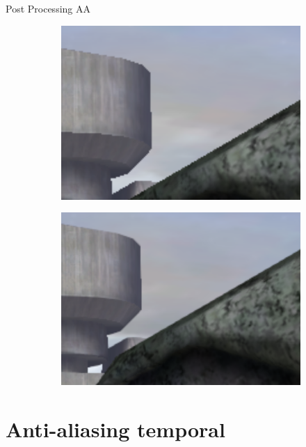 \documentclass[table]{beamer}
\begin{document}
\begin{frame}[fragile]{Post Processing AA}
    \begin{figure}[!htbp]
        \centering
        \begin{subfigure}[b]{0.45\textwidth}
            \includegraphics[width=\textwidth]{figures/smaaOFF.png}
        \end{subfigure}
        \centering
        \begin{subfigure}[b]{0.45\textwidth}
            \includegraphics[width=\textwidth]{figures/smaaON.png}
        \end{subfigure}
    \end{figure}
\end{frame}


\section{Anti-aliasing temporal}
\end{document}
